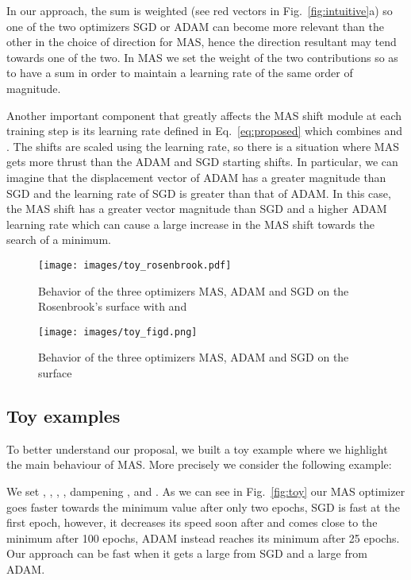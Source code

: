 \documentclass[10pt,twocolumn,letterpaper]{article}
\begin{document}
In our approach, the sum  is weighted (see red vectors in Fig.~\ref{fig:intuitive}a) so one of the two optimizers SGD or ADAM  can become more relevant than the other in the choice of direction for MAS, hence the direction resultant may tend towards one of the two.
In MAS we set the weight of the two contributions so as to have a sum  in order to maintain a learning rate of the same order of magnitude.

Another important component that greatly affects the MAS shift module at each training step is its learning rate defined in Eq.~\ref{eq:proposed} which combines  and .
The shifts are scaled using the learning rate, so there is a situation where MAS gets more thrust than the ADAM and SGD starting shifts.
In particular, we can imagine that the displacement vector of ADAM has a greater magnitude than SGD and the learning rate of SGD is greater than that of ADAM.
In this case, the MAS shift has a greater vector magnitude than SGD and a higher ADAM learning rate which can cause a large increase in the MAS shift towards the search of a minimum.


\begin{figure}
    \centering
\texttt{[image: images/toy\_rosenbrook.pdf]}
    \caption{
Behavior of the three optimizers MAS, ADAM and SGD on the Rosenbrook's surface with  and }
    \label{fig:toy_rosenbrook}
\end{figure}


\begin{figure}
    \centering
\texttt{[image: images/toy\_figd.png]}
    \caption{
Behavior of the three optimizers MAS, ADAM and SGD on the surface
     }
    \label{fig:toy_another}
\end{figure}

\subsection{Toy examples}
To better understand our proposal, we built a toy example where we highlight the main behaviour of MAS.
More precisely we consider the following example:



We set , , , , dampening ,  and .
As we can see in Fig.~\ref{fig:toy} our MAS optimizer goes faster towards the minimum value after only two epochs, SGD is fast at the first epoch, however, it decreases its speed soon after and comes close to the minimum after 100 epochs, ADAM instead reaches its minimum after 25 epochs.
Our approach can be fast when it gets a large  from SGD and a large  from ADAM.
\end{document}
